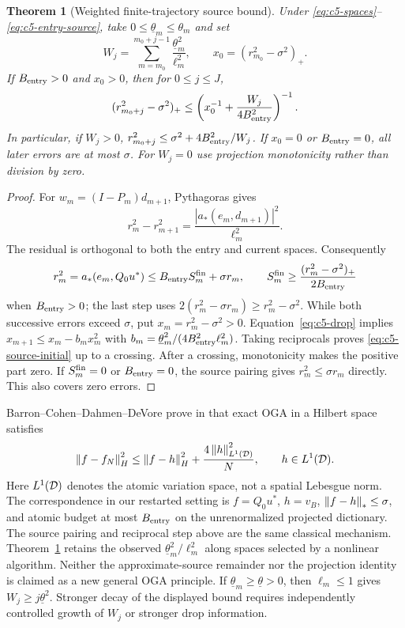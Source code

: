 \documentclass[11pt]{article}
\newtheorem{theorem}{Theorem}[section]
\theoremstyle{remark}
\begin{document}
\begin{theorem}[Weighted finite-trajectory source bound]
\label{thm:c5-source}
Under \eqref{eq:c5-spaces}--\eqref{eq:c5-entry-source}, take
$0\leq\underline\theta_m\leq\theta_m$ and set
\[
 W_j=\sum_{m=m_0}^{m_0+j-1}\frac{\underline\theta_m^2}{\ell_m^2},
 \qquad x_0=(r_{m_0}^2-\sigma^2)_+ .
\]
If $B_{\rm entry}>0$ and $x_0>0$, then for $0\leq j\leq J$,
\begin{equation}
 (r_{m_0+j}^2-\sigma^2)_+
 \leq\left(x_0^{-1}+\frac{W_j}{4B_{\rm entry}^2}\right)^{-1}.
 \label{eq:c5-source-initial}
\end{equation}
In particular, if $W_j>0$,
$r_{m_0+j}^2\leq\sigma^2+4B_{\rm entry}^2/W_j$.
If $x_0=0$ or $B_{\rm entry}=0$, all later errors are at most $\sigma$.
For $W_j=0$ use projection monotonicity rather than division by zero.
\end{theorem}
\begin{proof}
For $w_m=(I-P_m)d_{m+1}$, Pythagoras gives
\begin{equation}
 r_m^2-r_{m+1}^2
 =\frac{|a_*(e_m,d_{m+1})|^2}{\ell_m^2}.
 \label{eq:c5-drop}
\end{equation}
The residual is orthogonal to both the entry and current spaces.
Consequently
\[
 r_m^2=a_*(e_m,Q_0u^*)\leq B_{\rm entry}S_m^{\rm fin}+\sigma r_m,
 \qquad
 S_m^{\rm fin}\geq\frac{(r_m^2-\sigma^2)_+}{2B_{\rm entry}}
\]
when $B_{\rm entry}>0$; the last step uses
$2(r_m^2-\sigma r_m)\geq r_m^2-\sigma^2$.
While both successive errors exceed $\sigma$, put
$x_m=r_m^2-\sigma^2>0$. Equation~\eqref{eq:c5-drop} implies
$x_{m+1}\leq x_m-b_mx_m^2$ with
$b_m=\underline\theta_m^2/(4B_{\rm entry}^2\ell_m^2)$.
Taking reciprocals proves \eqref{eq:c5-source-initial} up to a crossing.
After a crossing, monotonicity makes the positive part zero.
If $S_m^{\rm fin}=0$ or $B_{\rm entry}=0$, the source pairing gives
$r_m^2\leq\sigma r_m$ directly. This also covers zero errors.
\end{proof}

Barron--Cohen--Dahmen--DeVore prove in
\cite[Theorem~2.3, equation~(2.31)]{BarronCohenDahmenDeVore2008}
that exact OGA in a Hilbert space satisfies
\begin{equation}
 \left\lVert f-f_N\right\rVert_H^2\leq\left\lVert f-h\right\rVert_H^2+
            \frac{4\left\lVert h\right\rVert_{L^1(\mathcal D)}^2}{N},\qquad h\in L^1(\mathcal D).
 \label{eq:c5-barron}
\end{equation}
Here $L^1(\mathcal D)$ denotes the atomic variation space, not a spatial
Lebesgue norm. The correspondence in our restarted setting is
$f=Q_0u^*$, $h=v_B$, $\left\lVert f-h\right\rVert_*\leq\sigma$, and atomic budget
at most $B_{\rm entry}$ on the unrenormalized projected dictionary.
The source pairing and reciprocal step above are the same classical
mechanism. Theorem~\ref{thm:c5-source} retains the observed
$\underline\theta_m^2/\ell_m^2$ along spaces selected by a nonlinear
algorithm. Neither the approximate-source remainder nor the projection
identity is claimed as a new general OGA principle.
If $\underline\theta_m\geq\underline\theta>0$, then $\ell_m\leq1$
gives $W_j\geq j\underline\theta^2$.
Stronger decay of the displayed bound requires independently controlled
growth of $W_j$ or stronger drop information.
\end{document}
